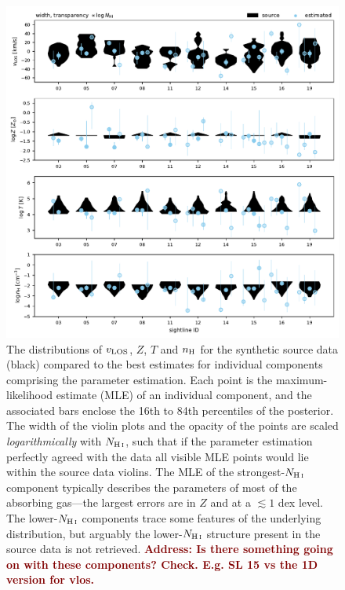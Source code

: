 \documentclass[fleqn,usenatbib]{mnras}
\newcommand{\todo}[1]{\textcolor{Maroon}{\textbf{Address: #1}}}
\begin{document}
\begin{figure}
    \centering
    \includegraphics[width=\textwidth]{figures/sample2/violin_vs_components_rerun.pdf}
    \caption{
    The distributions of $v_{\rm LOS}$, $Z$, $T$ and $n_{\rm H}$ for the synthetic source data (black) compared to the best estimates for individual components comprising the parameter estimation.
    Each point is the maximum-likelihood estimate (MLE) of an individual component,
    and the associated bars enclose the 16th to 84th percentiles of the posterior.
    The width of the violin plots and the opacity of the points are scaled \textit{logarithmically} with $N_{\ion{H}{I}}$,
    such that if the parameter estimation perfectly agreed with the data all visible MLE points would lie within the source data violins.
    The MLE of the strongest-$N_{\ion{H}{I}}$ component typically describes the parameters of most of the absorbing gas---the largest errors are in $Z$ and at a $\lesssim 1$ dex level.
    The lower-$N_{\ion{H}{I}}$ components trace some features of the underlying distribution,
    but arguably the lower-$N_{\ion{H}{I}}$ structure present in the source data is not retrieved.
    \todo{Is there something going on with these components? Check. E.g. SL 15 vs the 1D version for vlos.}
    }
    \label{f: sample2 violin vs components}
\end{figure}
\end{document}

